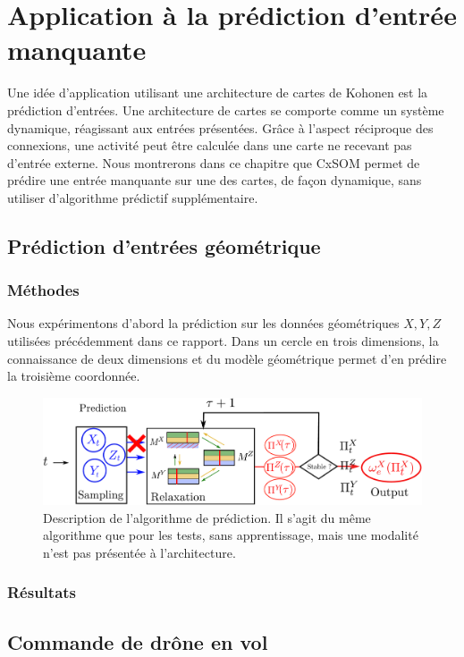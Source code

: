 \chapter{Application à la prédiction d'entrée manquante}
\graphicspath{{05-Application/}}
Une idée d'application utilisant une architecture de cartes de Kohonen est la prédiction d'entrées. Une architecture de cartes se comporte comme un système dynamique, réagissant aux entrées présentées. Grâce à l'aspect réciproque des connexions, une activité peut être calculée dans une carte ne recevant pas d'entrée externe. Nous montrerons dans ce chapitre que CxSOM permet de prédire une entrée manquante sur une des cartes, de façon dynamique, sans utiliser d'algorithme prédictif supplémentaire. 


\section{Prédiction d'entrées géométrique}

\subsection{Méthodes}
Nous expérimentons d'abord la prédiction sur les données géométriques $X,Y,Z$ utilisées précédemment dans ce rapport. Dans un cercle en trois dimensions, la connaissance de deux dimensions et du modèle géométrique permet d'en prédire la troisième coordonnée.

\begin{figure}
\centering
\includegraphics[width=\textwidth]{prediction_setup}
\caption{Description de l'algorithme de prédiction. Il s'agit du même algorithme que pour les tests, sans apprentissage, mais une modalité n'est pas présentée à l'architecture.}
\label{fig:schema}
\end{figure}


\subsection{Résultats}
\section{Commande de drône en vol}
